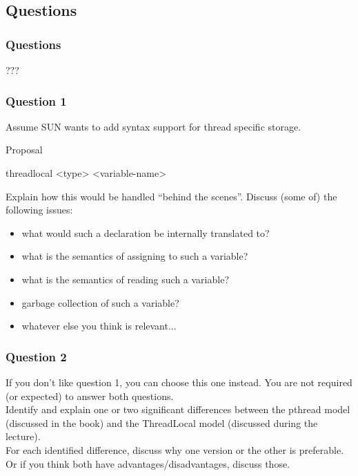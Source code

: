 \documentclass{beamer}
\begin{document}
\subsection{Questions}

\begin{frame}
  \frametitle{Questions}

  \begin{center}
  ???
  \end{center}

\end{frame}

\begin{frame}[fragile]
  \frametitle{Question 1}

Assume SUN wants to add syntax support for thread specific storage.

\begin{block}{Proposal}
\begin{semiverbatim}
\alert{threadlocal} <type> <variable-name>
\end{semiverbatim}
\end{block}

Explain how this would be handled ``behind the scenes''. Discuss (some of)
the following issues:
\begin{itemize}
\item what would such a declaration be internally translated to?
\item what is the semantics of assigning to such a variable?
\item what is the semantics of reading such a variable?
\item garbage collection of such a variable?
\item whatever else you think is relevant...
\end{itemize}

\end{frame}

\begin{frame}
  \frametitle{Question 2}

If you don't like question 1, you can choose this one instead. You are not required
(or expected) to answer both questions.\\
\vspace*{0.5cm}
Identify and explain one or two significant differences between the pthread
model (discussed in the book) and the ThreadLocal model
(discussed during the lecture).\\
\vspace*{0.5cm}
For each identified difference, discuss why one version or the other is preferable.
Or if you think both have advantages/disadvantages, discuss those.

\end{frame}
\end{document}
